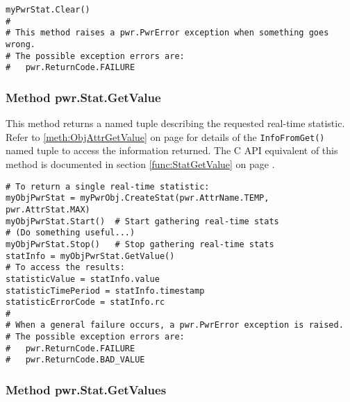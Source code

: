 \documentclass[12pt]{report} %
\begin{document}
\begin{appendices}
\begin{center}\begin{minipage}{.95\linewidth}\begin{lstlisting}
myPwrStat.Clear()
#
# This method raises a pwr.PwrError exception when something goes wrong.
# The possible exception errors are:
#   pwr.ReturnCode.FAILURE
\end{lstlisting}\end{minipage}\end{center}

\subsubsection{Method pwr.Stat.GetValue} \label{meth:StatGetValue}

This method returns a named tuple describing the requested real-time statistic. Refer to
\ref{meth:ObjAttrGetValue} on page \pageref{meth:ObjAttrGetValue} for details
of the \texttt{InfoFromGet()} named tuple to access the information returned. The
C API equivalent of this method is documented in section
\ref{func:StatGetValue} on page \pageref{func:StatGetValue}.

\begin{center}\begin{minipage}{.95\linewidth}\begin{lstlisting}
# To return a single real-time statistic:
myObjPwrStat = myPwrObj.CreateStat(pwr.AttrName.TEMP, pwr.AttrStat.MAX)
myObjPwrStat.Start()  # Start gathering real-time stats
# (Do something useful...)
myObjPwrStat.Stop()   # Stop gathering real-time stats
statInfo = myObjPwrStat.GetValue()
# To access the results:
statisticValue = statInfo.value
statisticTimePeriod = statInfo.timestamp
statisticErrorCode = statInfo.rc
#
# When a general failure occurs, a pwr.PwrError exception is raised.
# The possible exception errors are:
#   pwr.ReturnCode.FAILURE
#   pwr.ReturnCode.BAD_VALUE
\end{lstlisting}\end{minipage}\end{center}

\subsubsection{Method pwr.Stat.GetValues} \label{meth:StatGetValues}


\end{appendices}
\end{document}
